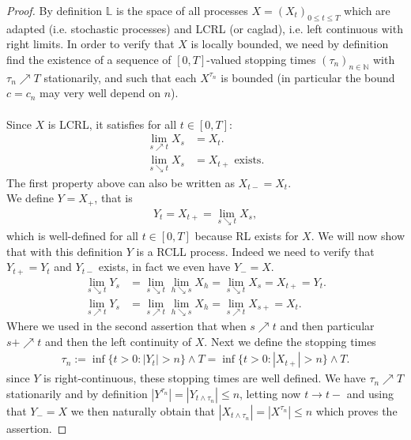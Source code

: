 \documentclass[12pt,a4paper, twoside]{article}
\theoremstyle{definition}
\begin{document}
\begin{proof}
By definition $\mathbb{L}$ is the space of all processes $X=(X_t)_{0 \leq t \leq T}$ which are adapted (i.e. stochastic processes) and LCRL (or caglad), i.e. left continuous with right limits. In order to verify that $X$ is locally bounded, we need by definition find the existence of a sequence of $[0,T]$-valued stopping times $( \tau_n)_{n \in \mathbb{N}}$ with $\tau_n \nearrow T$ stationarily, and such that each $X^{\tau_n}$ is bounded (in particular the bound $c=c_n$ may very well depend on $n$). 
\\
\\
Since $X$ is LCRL, it satisfies for all $t \in [0,T]$:
\begin{align*}
\lim_{s \nearrow t} X_s&=X_t. \\
\lim_{s \searrow t} X_s&= X_{t+} \text{ exists}.
\end{align*}
The first property above can also be written as $X_{t-}=X_t$. \\
 We define $Y=X_+$, that is
\begin{align*}
Y_t=X_{t+}= \lim_{s \searrow t} X_s,
\end{align*} which is well-defined for all $t \in [0,T]$ because RL exists for $X$. We will now show that with this definition $Y$ is a RCLL process. Indeed we need to verify that $Y_{t+}=Y_t$ and $Y_{t-}$ exists, in fact we even have $Y_-=X$.
\begin{align*}
\lim_{s \searrow t} Y_s &= \lim_{s \searrow t} \lim_{ h \searrow s} X_h = \lim_{s \searrow t} X_{s} = X_{t+}=Y_t. \tag{RC} \\
\lim_{s \nearrow t} Y_s& = \lim_{s \nearrow t} \lim_{h \searrow s} X_h = \lim_{s \nearrow t} X_{s+} = X_t.
\end{align*}
Where we used in the second assertion that when $s \nearrow t$ and then particular $s+ \nearrow t$ and then the left continuity of $X$. Next we define the stopping times
\begin{align*}
\tau_n := \inf \{ t > 0 : |Y_t| > n \} \wedge T = \inf \{t >0 : |X_{t+}| >n \} \wedge T.
\end{align*}
since $Y$ is right-continuous, these stopping times are well defined. We have $\tau_n \nearrow T$ stationarily and by definition $|Y^{\tau_n}|=|Y_{ t \wedge \tau_n}| \leq n$, letting now $t \to t-$ and using that $Y_-=X$ we then naturally obtain that $|X_{t \wedge \tau_n}|=|X^{\tau_n}| \leq n$ which proves the assertion.
\end{proof}
\end{document}
